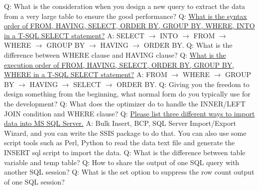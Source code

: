 \documentclass[a4paper,11pt]{article}
\begin{document}
\noindent 
Q: What is the consideration when you design a new query to extract the data from a very large table to ensure the good performance? \newline \newline
\noindent 
Q: \ul{What is the syntax order of FROM, HAVING, SELECT, ORDER BY, GROUP BY, WHERE, INTO in a T-SQL SELECT statement?} \newline
A: SELECT $\rightarrow$ INTO $\rightarrow$ FROM $\rightarrow$ WHERE $\rightarrow$ GROUP BY $\rightarrow$ HAVING $\rightarrow$ ORDER BY. \newline \newline
\noindent 
Q: What is the difference between WHERE clause and HAVING clause? \newline \newline
\noindent 
Q: \ul{What is the execution order of FROM, HAVING, SELECT, ORDER BY, GROUP BY, WHERE in a T-SQL SELECT statement?} \newline
A: FROM $\rightarrow$ WHERE $\rightarrow$ GROUP BY $\rightarrow$ HAVING $\rightarrow$ SELECT $\rightarrow$ ORDER BY. \newline \newline
\noindent 
Q: Giving you the freedom to design something from the beginning, what normal form do you typically use for the development? \newline \newline
\noindent 
Q: What does the optimizer do to handle the INNER/LEFT JOIN condition and WHERE clause? \newline \newline
\noindent 
Q: \ul{Please list three different ways to import data into MS SQL Server.} \newline
A: Bulk Insert, BCP, SQL Server Import/Export Wizard, and you can write the SSIS package to do that. You can also use some script tools such as Perl, Python to read the data text file and generate the INSERT sql script to import the data.\newline\newline
\noindent 
Q: What is the difference between table variable and temp table? \newline \newline
\noindent 
Q: How to share the output of one SQL query with another SQL session? \newline \newline
\noindent 
Q: What is the set option to suppress the row count output of one SQL session? \newline \newline
\end{document}
